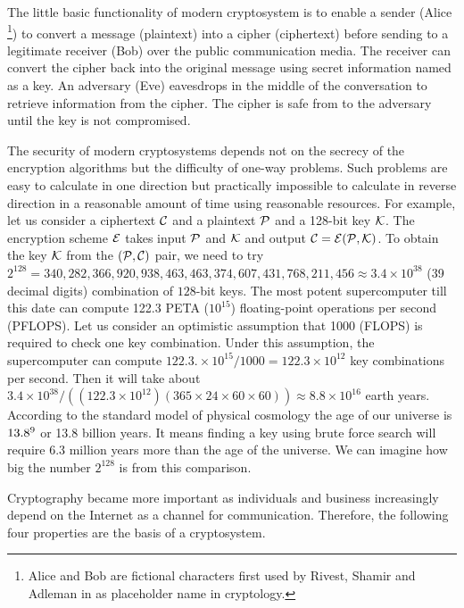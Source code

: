 The little basic functionality of modern cryptosystem is to enable a sender (Alice \footnote{Alice and Bob are fictional characters first used by Rivest, Shamir and Adleman in \cite{rivest1978method} as placeholder name in cryptology.}) to convert a message (plaintext) into a cipher (ciphertext) before sending to a legitimate receiver (Bob) over the public communication media. 
The receiver can convert the cipher back into the original message using secret information named as a key.
An adversary (Eve) eavesdrops in the middle of the conversation to retrieve information from the cipher.
The cipher is safe from to the adversary until the key is not compromised. 

The security of modern cryptosystems depends not on the secrecy of the encryption algorithms but the difficulty of one-way problems. 
Such problems are easy to calculate in one direction but practically impossible to calculate in reverse direction in a reasonable amount of time using reasonable resources.
For example, let us consider a ciphertext $\cal{C}$ and a plaintext $\cal{P}$ and a 128-bit key $\cal{K}$. 
The encryption scheme $\cal{E}$ takes input $\cal{P}$ and $\cal{K}$ and output $\cal{C}=E( \cal{P}, K)$. 
To obtain the  key $\cal{K}$ from the $(\cal{P,C})$ pair, we need to try $2^{128} = 340,282,366,920,938,463,463,374,607,431,768,211,456 \approx 3.4 \times 10^{38}$ (39 decimal digits) combination of $128$-bit keys.
The most potent supercomputer till this date can compute 122.3 PETA ($10^{15}$) floating-point operations per second (PFLOPS).
Let us consider an optimistic assumption that 1000 (FLOPS) is required to check one key combination.
Under this assumption, the supercomputer can compute $122.3. \times 10^{15} / 1000 = 122.3 \times 10^{12}$ key combinations per second.
Then it will take about $3.4 \times 10^{38}/((122.3 \times 10^{12})(365 \times 24 \times 60 \times 60)) \approx  8.8 \times 10^{16}$ earth years.
According to the standard model of physical cosmology \cite{Ade:2015xua} the age of our universe is $13.8 \time 10^9$ or 13.8 billion years. 
It means finding a key using brute force search will require $6.3$ million years more than the age of the universe.
We can imagine how big the number $2^{128}$ is from this comparison.

Cryptography became more important as individuals and business increasingly depend on the Internet as a channel for communication. Therefore, the following four properties are the basis of a cryptosystem.


